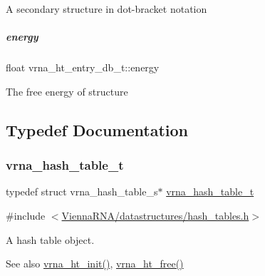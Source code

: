 A secondary structure in dot-\/bracket notation \mbox{\label{group__hash__table__utils_afffab6040a5cfc3ac465d94d8538d88a}} 
\subparagraph{\texorpdfstring{energy}{energy}}
{\footnotesize\ttfamily float vrna\+\_\+ht\+\_\+entry\+\_\+db\+\_\+t\+::energy}

The free energy of {\ttfamily structure} 

\subsection{Typedef Documentation}
\mbox{\label{group__hash__table__utils_gabc7c6f41b718c8e23929e528891a89c4}} 
\subsubsection{\texorpdfstring{vrna\+\_\+hash\+\_\+table\+\_\+t}{vrna\_hash\_table\_t}}
{\footnotesize\ttfamily typedef struct vrna\+\_\+hash\+\_\+table\+\_\+s$\ast$ \hyperlink{group__hash__table__utils_gabc7c6f41b718c8e23929e528891a89c4}{vrna\+\_\+hash\+\_\+table\+\_\+t}}



{\ttfamily \#include $<$\hyperlink{hash__tables_8h}{Vienna\+R\+N\+A/datastructures/hash\+\_\+tables.\+h}$>$}



A hash table object. 

\begin{DoxySeeAlso}{See also}
\hyperlink{group__hash__table__utils_ga37d1c7e13087a2b7c1b87fda34577c29}{vrna\+\_\+ht\+\_\+init()}, \hyperlink{group__hash__table__utils_ga479db024c70437aa2576d60b373c5262}{vrna\+\_\+ht\+\_\+free()} 
\end{DoxySeeAlso}
\mbox{\label{group__hash__table__utils_gace4adf608f9dc246f66f6264d30c0f8d}} 
